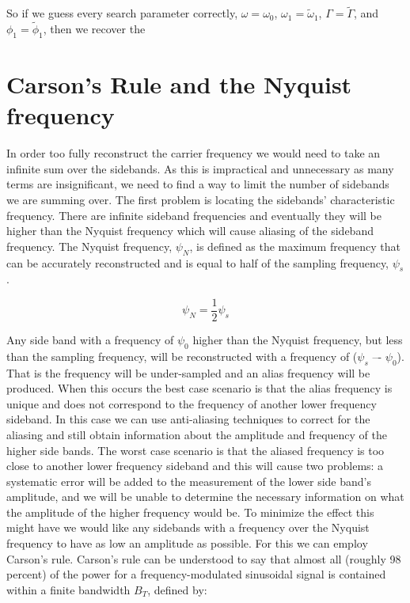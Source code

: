 \documentclass[onecolumn, groupedaddress, 10pt]{revtex4-1}
\begin{document}
So if we guess every search parameter correctly, $\omega = \omega_0$, $\omega_1 = \widetilde{\omega}_1$, $\Gamma = \widetilde{\Gamma}$, and $\phi_1 = \widetilde{\phi}_1$, then we recover the 







\section{Carson's Rule and the Nyquist frequency}
In order too fully reconstruct the carrier frequency we would need to take an infinite sum over the sidebands. As this is impractical and unnecessary as many terms are insignificant, we need to find a way to limit the number of sidebands we are summing over. The first problem is locating the sidebands' characteristic frequency. There are infinite sideband frequencies and eventually they will be higher than the Nyquist frequency which will cause aliasing of the sideband frequency. The Nyquist frequency, $\psi_N$, is defined as the maximum frequency that can be accurately reconstructed and is equal to half of the sampling frequency, $\psi_s$.

\begin{equation}
\psi_N = \frac{1}{2}\psi_s
\end{equation}

Any side band with a frequency of $\psi_0$ higher than the Nyquist frequency, but less than the sampling frequency, will be reconstructed with a frequency of ($\psi_s$ –- $\psi_0$). That is the frequency will be under-sampled and an alias frequency will be produced. When this occurs the best case scenario is that the alias frequency is unique and does not correspond to the frequency of another lower frequency sideband. In this case we can use anti-aliasing techniques to correct for the aliasing and still obtain information about the amplitude and frequency of the higher side bands. The worst case scenario is that the aliased frequency is too close to another lower frequency sideband and this will cause two problems: a systematic error will be added to the measurement of the lower side band’s amplitude, and we will be unable to determine the necessary information on what the amplitude of the higher frequency would be. To minimize the effect this might have we would like any sidebands with a frequency over the Nyquist frequency to have as low an amplitude as possible. For this we can employ Carson’s rule. Carson’s rule can be understood to say that almost all (roughly 98 percent) of the power for a frequency-modulated sinusoidal signal is contained within a finite bandwidth $B_T$, defined by:
\end{document}
